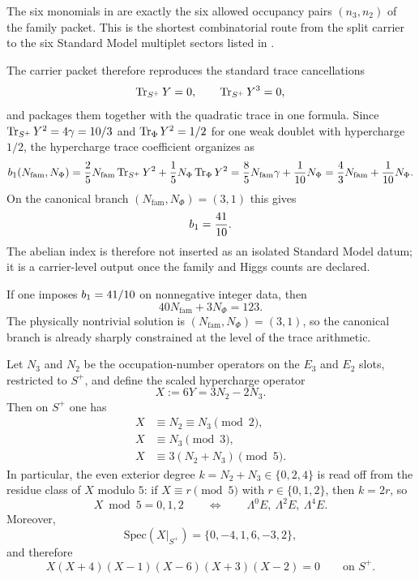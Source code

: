 \begin{remark}
The six monomials in  are exactly the six allowed occupancy pairs $(n_3,n_2)$ of the family packet. This is the shortest combinatorial route from the split carrier to the six Standard Model multiplet sectors listed in .
\end{remark}

The carrier packet therefore reproduces the standard trace cancellations
\[
\operatorname{Tr}_{S^+}Y=0,
\qquad
\operatorname{Tr}_{S^+}Y^3=0,
\]
and packages them together with the quadratic trace in one formula. Since $\operatorname{Tr}_{S^+}Y^2=4\gamma=10/3$ and $\operatorname{Tr}_\Phi Y^2=1/2$ for one weak doublet with hypercharge $1/2$, the hypercharge trace coefficient organizes as
\begin{equation}
\label{eq:abelian-index}
b_1(N_{\mathrm{fam}},N_\Phi)
=
\frac25N_{\mathrm{fam}}\operatorname{Tr}_{S^+}Y^2+\frac15N_\Phi\operatorname{Tr}_\Phi Y^2
=
\frac85N_{\mathrm{fam}}\gamma+\frac1{10}N_\Phi
=
\frac43N_{\mathrm{fam}}+\frac1{10}N_\Phi.
\end{equation}
On the canonical branch $(N_{\mathrm{fam}},N_\Phi)=(3,1)$ this gives
\[
b_1=\frac{41}{10}.
\]
The abelian index is therefore not inserted as an isolated Standard Model datum; it is a carrier-level output once the family and Higgs counts are declared.

\begin{remark}
If one imposes $b_1=41/10$ on nonnegative integer data, then
\[
40N_{\mathrm{fam}}+3N_\Phi=123.
\]
The physically nontrivial solution is $(N_{\mathrm{fam}},N_\Phi)=(3,1)$, so the canonical branch is already sharply constrained at the level of the trace arithmetic.
\end{remark}

\begin{proposition}
\label{prop:family-hypercharge-compression}
Let $N_3$ and $N_2$ be the occupation-number operators on the $E_3$ and $E_2$ slots, restricted to $S^+$, and define the scaled hypercharge operator
\[
X:=6Y=3N_2-2N_3.
\]
Then on $S^+$ one has
\begin{align}
X&\equiv N_2\equiv N_3 \pmod 2,\label{eq:x-mod-2}\\
X&\equiv N_3 \pmod 3,\label{eq:x-mod-3}\\
X&\equiv 3(N_2+N_3) \pmod 5.\label{eq:x-mod-5}
\end{align}
In particular, the even exterior degree $k=N_2+N_3\in\{0,2,4\}$ is read off from the residue class of $X$ modulo $5$: if $X\equiv r\pmod 5$ with $r\in\{0,1,2\}$, then $k=2r$, so
\[
X\bmod 5=0,1,2
\qquad\Longleftrightarrow\qquad
\Lambda^0E,\ \Lambda^2E,\ \Lambda^4E.
\]
Moreover,
\[
\mathrm{Spec}(X|_{S^+})=\{0,-4,1,6,-3,2\},
\]
and therefore
\begin{equation}
\label{eq:family-x-polynomial}
X(X+4)(X-1)(X-6)(X+3)(X-2)=0
\qquad\text{on }S^+.
\end{equation}
\end{proposition}


